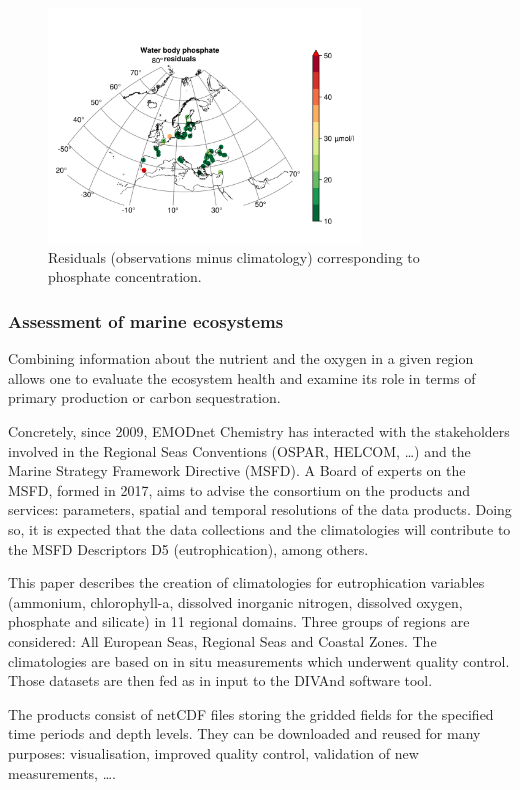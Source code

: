 \documentclass[essd, manuscript]{copernicus}
\begin{document}
\begin{figure}[t]
\includegraphics[width=8.3cm]{residuals_Water_body_phosphate.png}
\caption{Residuals (observations minus climatology) corresponding to phosphate concentration.\label{fig:residuals}}
\end{figure}

\subsubsection{Assessment of marine ecosystems}

Combining information about the nutrient and the oxygen in a given region allows one to evaluate the ecosystem health and examine its role in terms of primary production or carbon sequestration.

Concretely, since 2009, EMODnet Chemistry has interacted with the stakeholders involved in the Regional Seas Conventions (OSPAR, HELCOM, \ldots) and the Marine Strategy Framework Directive (MSFD). A Board of experts on the MSFD, formed in 2017, aims to advise the consortium on the products and services: parameters, spatial and temporal resolutions of the data products. Doing so, it is expected that the data collections and the climatologies will contribute to the MSFD Descriptors D5 (eutrophication), among others.

\conclusions  
This paper describes the creation of climatologies for eutrophication variables (ammonium, chlorophyll-a, dissolved inorganic nitrogen, dissolved oxygen, phosphate and silicate) in 11 regional domains. Three groups of regions are considered: All European Seas, Regional Seas and Coastal Zones. The climatologies are based on in situ measurements which underwent quality control. Those datasets are then fed as in input to the DIVAnd software tool. 

The products consist of netCDF files storing the gridded fields for the specified time periods and depth levels. They can be downloaded and reused for many purposes: visualisation, improved quality control, validation of new measurements, \ldots. 
\end{document}
